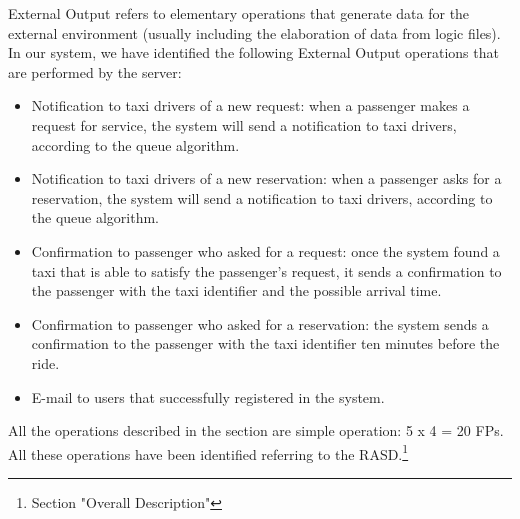 External Output refers to elementary operations that generate data for the external environment (usually including the elaboration of data from logic files).
\newline
In our system, we have identified the following External Output operations that are performed by the server:
\begin{itemize}
    \item Notification to taxi drivers of a new request: when a passenger makes a request for service, the system will send a notification to taxi drivers, according to the queue algorithm. 
    \item Notification to taxi drivers of a new reservation: when a passenger asks for a reservation, the system will send a notification to taxi drivers, according to the queue algorithm. 
    \item Confirmation to passenger who asked for a request: once the system found a taxi that is able to satisfy the passenger's request, it sends a confirmation to the passenger with the taxi identifier and the possible arrival time. 
    \item Confirmation to passenger who asked for a reservation: the system sends a confirmation to the passenger with the taxi identifier ten minutes before the ride. 
    \item E-mail to users that successfully registered in the system. 
\end{itemize}
All the operations described in the section are simple operation: 5 x 4 = 20 FPs.
\newline
All these operations have been identified referring to the RASD.\footnote{\label{note1} Section "Overall Description"}